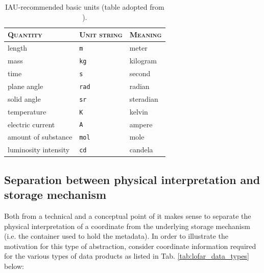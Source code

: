 \documentclass[a4paper,10pt,bibtotoc]{scrreprt}
\begin{document}
\begin{table}[ht]
  \centering
  \begin{tabular}{lll}
    \hline
    \textsc{Quantity} & \textsc{Unit string} & \textsc{Meaning} \\
    \hline \hline
    length               & \texttt{m}   & meter \\
    mass                 & \texttt{kg}  & kilogram \\
    time                 & \texttt{s}   & second \\
    plane angle          & \texttt{rad} & radian \\
    solid angle          & \texttt{sr}  & steradian \\
    temperature          & \texttt{K}   & kelvin \\
    electric current     & \texttt{A}   & ampere \\
    amount of substance  & \texttt{mol} & mole \\
    luminosity intensity & \texttt{cd}  & candela \\
    \hline
  \end{tabular}
  \caption{IAU-recommended basic units (table adopted from \cite{fits.paper3}).}
  \label{tab:basic-units}
\end{table}

\subsection{Separation between physical interpretation and storage mechanism}
\label{sec:abstraction-formalism}

Both from a technical and a conceptual point of it makes sense to
separate the physical interpretation of a coordinate from the
underlying storage mechanism (i.e. the container used to hold the
metadata). In order to illustrate the motivation for this type of
abstraction, consider coordinate information required for the various
types of data products as listed in Tab. \ref{tab:lofar_data_types} below:


\end{document}
